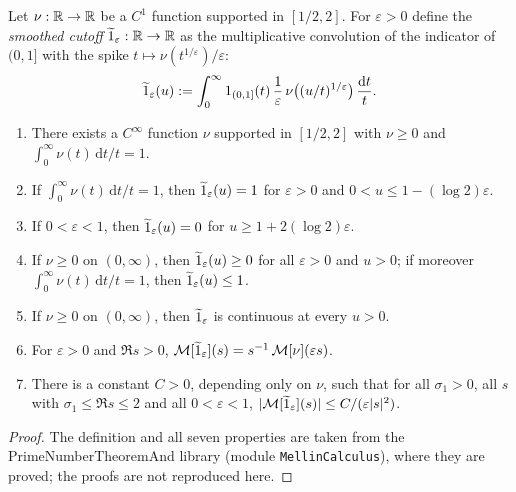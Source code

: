 \begin{proposition}\label{prop:smooth-cutoff}
Let $\nu : \mathbb{R} \to \mathbb{R}$ be a $C^1$ function supported in $[1/2, 2]$. For $\varepsilon > 0$ define the
\emph{smoothed cutoff} $\widetilde{1}_\varepsilon : \mathbb{R} \to \mathbb{R}$ as the multiplicative convolution of the indicator
of $(0, 1]$ with the spike $t \mapsto \nu(t^{1/\varepsilon})/\varepsilon$:
$$\widetilde{1}_\varepsilon(u) := \int_0^\infty 1_{(0,1]}(t)\, \frac{1}{\varepsilon}\, \nu\big((u/t)^{1/\varepsilon}\big)\, \frac{\mathrm{d}t}{t} .$$
\begin{enumerate}
\item There exists a $C^\infty$ function $\nu$ supported in $[1/2, 2]$ with $\nu \ge 0$ and $\int_0^\infty \nu(t)\,\mathrm{d}t/t = 1$.
\item If $\int_0^\infty \nu(t)\,\mathrm{d}t/t = 1$, then $\widetilde{1}_\varepsilon(u) = 1$ for $\varepsilon > 0$ and $0 < u \le 1 - (\log 2)\varepsilon$.
\item If $0 < \varepsilon < 1$, then $\widetilde{1}_\varepsilon(u) = 0$ for $u \ge 1 + 2(\log 2)\varepsilon$.
\item If $\nu \ge 0$ on $(0, \infty)$, then $\widetilde{1}_\varepsilon(u) \ge 0$ for all $\varepsilon > 0$ and $u > 0$; if moreover
$\int_0^\infty \nu(t)\,\mathrm{d}t/t = 1$, then $\widetilde{1}_\varepsilon(u) \le 1$.
\item If $\nu \ge 0$ on $(0, \infty)$, then $\widetilde{1}_\varepsilon$ is continuous at every $u > 0$.
\item For $\varepsilon > 0$ and $\Re s > 0$, $\mathcal{M}[\widetilde{1}_\varepsilon](s) = s^{-1}\, \mathcal{M}[\nu](\varepsilon s)$.
\item There is a constant $C > 0$, depending only on $\nu$, such that for all $\sigma_1 > 0$, all $s$ with
$\sigma_1 \le \Re s \le 2$ and all $0 < \varepsilon < 1$, $|\mathcal{M}[\widetilde{1}_\varepsilon](s)| \le C/(\varepsilon |s|^2)$.
\end{enumerate}
\leanok
\end{proposition}
\begin{proof}\leanok
The definition and all seven properties are taken from the PrimeNumberTheoremAnd library
\cite{PNTplus} (module \texttt{MellinCalculus}), where they are proved; the proofs are not reproduced
here.
\end{proof}

